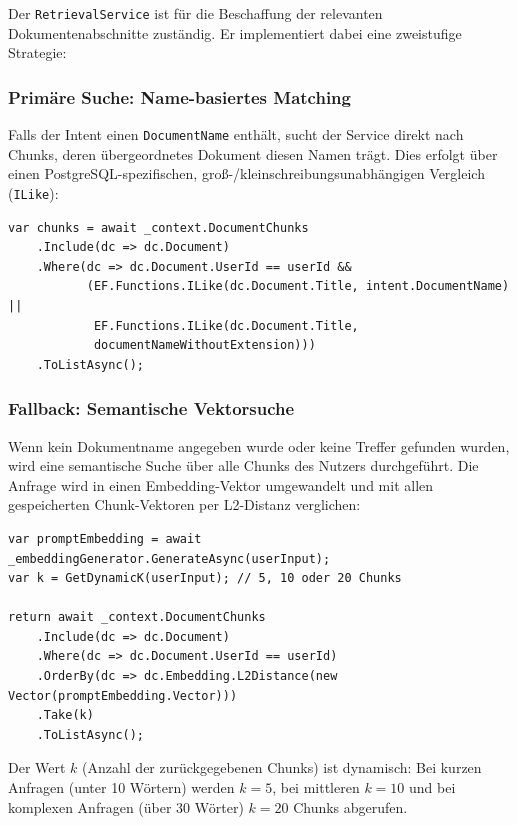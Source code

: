 Der \texttt{RetrievalService} ist f\"ur die Beschaffung der relevanten Dokumentenabschnitte zust\"andig. Er implementiert dabei eine zweistufige Strategie:

\subsubsection{Prim\"are Suche: Name-basiertes Matching}
Falls der Intent einen \texttt{DocumentName} enth\"alt, sucht der Service direkt nach Chunks, deren \"ubergeordnetes Dokument diesen Namen tr\"agt. Dies erfolgt \"uber einen PostgreSQL-spezifischen, gro\ss{}-/kleinschreibungsunabh\"angigen Vergleich (\texttt{ILike}):

\begin{lstlisting}[language={[Sharp]C}, caption={Dokumenten-spezifische Suche in RetrievalService.cs}]
var chunks = await _context.DocumentChunks
    .Include(dc => dc.Document)
    .Where(dc => dc.Document.UserId == userId &&
           (EF.Functions.ILike(dc.Document.Title, intent.DocumentName) ||
            EF.Functions.ILike(dc.Document.Title,
            documentNameWithoutExtension)))
    .ToListAsync();
\end{lstlisting}

\subsubsection{Fallback: Semantische Vektorsuche}
Wenn kein Dokumentname angegeben wurde oder keine Treffer gefunden wurden, wird eine semantische Suche \"uber alle Chunks des Nutzers durchgef\"uhrt. Die Anfrage wird in einen Embedding-Vektor umgewandelt und mit allen gespeicherten Chunk-Vektoren per L2-Distanz verglichen:

\begin{lstlisting}[language={[Sharp]C}, caption={Embedding-basierte Vektorsuche in RetrievalService.cs}]
var promptEmbedding = await _embeddingGenerator.GenerateAsync(userInput);
var k = GetDynamicK(userInput); // 5, 10 oder 20 Chunks

return await _context.DocumentChunks
    .Include(dc => dc.Document)
    .Where(dc => dc.Document.UserId == userId)
    .OrderBy(dc => dc.Embedding.L2Distance(new Vector(promptEmbedding.Vector)))
    .Take(k)
    .ToListAsync();
\end{lstlisting}

Der Wert $k$ (Anzahl der zur\"uckgegebenen Chunks) ist dynamisch: Bei kurzen Anfragen (unter 10 W\"ortern) werden $k=5$, bei mittleren $k=10$ und bei komplexen Anfragen (\"uber 30 W\"orter) $k=20$ Chunks abgerufen.

